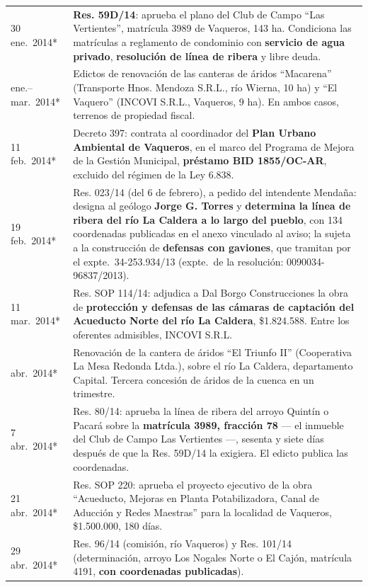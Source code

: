 \begin{longtable}{@{}p{2.7cm}p{10.3cm}@{}}
30 ene.\ 2014* & \textbf{Res. 59D/14}: aprueba el plano del Club de Campo ``Las Vertientes'', matrícula 3989 de Vaqueros, 143 ha. Condiciona las matrículas a reglamento de condominio con \textbf{servicio de agua privado}, \textbf{resolución de línea de ribera} y libre deuda. \\
ene.--mar.\ 2014* & Edictos de renovación de las canteras de áridos ``Macarena'' (Transporte Hnos. Mendoza S.R.L., río Wierna, 10 ha) y ``El Vaquero'' (INCOVI S.R.L., Vaqueros, 9 ha). En ambos casos, terrenos de propiedad fiscal. \\
11 feb.\ 2014* & Decreto 397: contrata al coordinador del \textbf{Plan Urbano Ambiental de Vaqueros}, en el marco del Programa de Mejora de la Gestión Municipal, \textbf{préstamo BID 1855/OC-AR}, excluido del régimen de la Ley 6.838. \\
19 feb.\ 2014* & Res. 023/14 (del 6 de febrero), a pedido del intendente Mendaña: designa al geólogo \textbf{Jorge G. Torres} y \textbf{determina la línea de ribera del río La Caldera a lo largo del pueblo}, con 134 coordenadas publicadas en el anexo vinculado al aviso; la sujeta a la construcción de \textbf{defensas con gaviones}, que tramitan por el expte.\ 34-253.934/13 (expte.\ de la resolución: 0090034-96837/2013). \\
11 mar.\ 2014* & Res. SOP 114/14: adjudica a Dal Borgo Construcciones la obra de \textbf{protección y defensas de las cámaras de captación del Acueducto Norte del río La Caldera}, \$1.824.588. Entre los oferentes admisibles, INCOVI S.R.L. \\
abr.\ 2014* & Renovación de la cantera de áridos ``El Triunfo II'' (Cooperativa La Mesa Redonda Ltda.), sobre el río La Caldera, departamento Capital. Tercera concesión de áridos de la cuenca en un trimestre. \\
7 abr.\ 2014* & Res. 80/14: aprueba la línea de ribera del arroyo Quintín o Pacará sobre la \textbf{matrícula 3989, fracción 78} --- el inmueble del Club de Campo Las Vertientes ---, sesenta y siete días después de que la Res. 59D/14 la exigiera. El edicto publica las coordenadas. \\
21 abr.\ 2014* & Res. SOP 220: aprueba el proyecto ejecutivo de la obra ``Acueducto, Mejoras en Planta Potabilizadora, Canal de Aducción y Redes Maestras'' para la localidad de Vaqueros, \$1.500.000, 180 días. \\
29 abr.\ 2014* & Res. 96/14 (comisión, río Vaqueros) y Res. 101/14 (determinación, arroyo Los Nogales Norte o El Cajón, matrícula 4191, \textbf{con coordenadas publicadas}). \\

\end{longtable}
